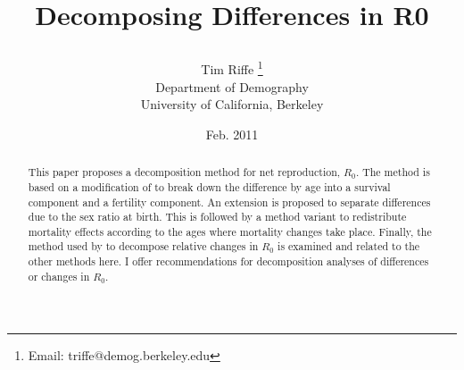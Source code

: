 \documentclass{article}
\begin{document}
\title{\textbf{Decomposing Differences in R0}
\author{Tim Riffe \footnote{Email: triffe@demog.berkeley.edu}\\
Department of Demography\\ 
University of California, Berkeley \\
}
\date{Feb. 2011}
}
\maketitle

\begin{abstract}
This paper proposes a decomposition method for net reproduction, $R_{0}$. The method is based on a modification
of \citet{kltagawa1955components} to break down the difference by age into a
survival component and a fertility component. An extension is proposed to separate differences due to the sex ratio at birth. This is followed by a method variant to redistribute mortality effects according to the ages where mortality changes take place. Finally, the method used by \citet{lillova2008r0decomp} to decompose relative changes in $R_{0}$ is examined and related to the other methods here. I offer recommendations for decomposition analyses of differences or changes in $R_{0}$.
\end{abstract}


\pagebreak

\end{document}

